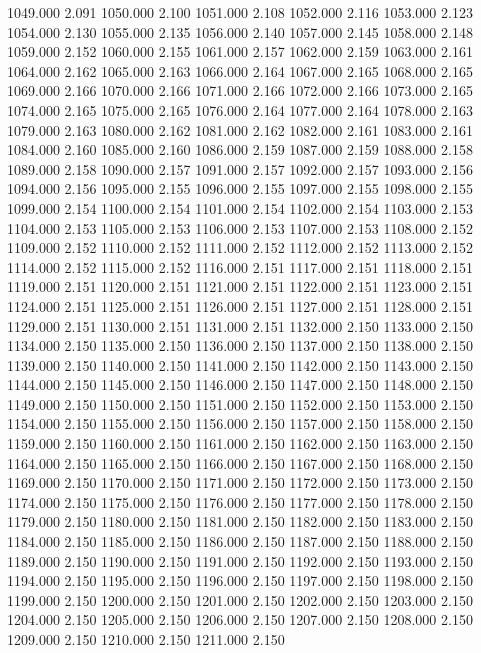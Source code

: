 1049.000 2.091 
1050.000 2.100 
1051.000 2.108 
1052.000 2.116 
1053.000 2.123 
1054.000 2.130 
1055.000 2.135 
1056.000 2.140 
1057.000 2.145 
1058.000 2.148 
1059.000 2.152 
1060.000 2.155 
1061.000 2.157 
1062.000 2.159 
1063.000 2.161 
1064.000 2.162 
1065.000 2.163 
1066.000 2.164 
1067.000 2.165 
1068.000 2.165 
1069.000 2.166 
1070.000 2.166 
1071.000 2.166 
1072.000 2.166 
1073.000 2.165 
1074.000 2.165 
1075.000 2.165 
1076.000 2.164 
1077.000 2.164 
1078.000 2.163 
1079.000 2.163 
1080.000 2.162 
1081.000 2.162 
1082.000 2.161 
1083.000 2.161 
1084.000 2.160 
1085.000 2.160 
1086.000 2.159 
1087.000 2.159 
1088.000 2.158 
1089.000 2.158 
1090.000 2.157 
1091.000 2.157 
1092.000 2.157 
1093.000 2.156 
1094.000 2.156 
1095.000 2.155 
1096.000 2.155 
1097.000 2.155 
1098.000 2.155 
1099.000 2.154 
1100.000 2.154 
1101.000 2.154 
1102.000 2.154 
1103.000 2.153 
1104.000 2.153 
1105.000 2.153 
1106.000 2.153 
1107.000 2.153 
1108.000 2.152 
1109.000 2.152 
1110.000 2.152 
1111.000 2.152 
1112.000 2.152 
1113.000 2.152 
1114.000 2.152 
1115.000 2.152 
1116.000 2.151 
1117.000 2.151 
1118.000 2.151 
1119.000 2.151 
1120.000 2.151 
1121.000 2.151 
1122.000 2.151 
1123.000 2.151 
1124.000 2.151 
1125.000 2.151 
1126.000 2.151 
1127.000 2.151 
1128.000 2.151 
1129.000 2.151 
1130.000 2.151 
1131.000 2.151 
1132.000 2.150 
1133.000 2.150 
1134.000 2.150 
1135.000 2.150 
1136.000 2.150 
1137.000 2.150 
1138.000 2.150 
1139.000 2.150 
1140.000 2.150 
1141.000 2.150 
1142.000 2.150 
1143.000 2.150 
1144.000 2.150 
1145.000 2.150 
1146.000 2.150 
1147.000 2.150 
1148.000 2.150 
1149.000 2.150 
1150.000 2.150 
1151.000 2.150 
1152.000 2.150 
1153.000 2.150 
1154.000 2.150 
1155.000 2.150 
1156.000 2.150 
1157.000 2.150 
1158.000 2.150 
1159.000 2.150 
1160.000 2.150 
1161.000 2.150 
1162.000 2.150 
1163.000 2.150 
1164.000 2.150 
1165.000 2.150 
1166.000 2.150 
1167.000 2.150 
1168.000 2.150 
1169.000 2.150 
1170.000 2.150 
1171.000 2.150 
1172.000 2.150 
1173.000 2.150 
1174.000 2.150 
1175.000 2.150 
1176.000 2.150 
1177.000 2.150 
1178.000 2.150 
1179.000 2.150 
1180.000 2.150 
1181.000 2.150 
1182.000 2.150 
1183.000 2.150 
1184.000 2.150 
1185.000 2.150 
1186.000 2.150 
1187.000 2.150 
1188.000 2.150 
1189.000 2.150 
1190.000 2.150 
1191.000 2.150 
1192.000 2.150 
1193.000 2.150 
1194.000 2.150 
1195.000 2.150 
1196.000 2.150 
1197.000 2.150 
1198.000 2.150 
1199.000 2.150 
1200.000 2.150 
1201.000 2.150 
1202.000 2.150 
1203.000 2.150 
1204.000 2.150 
1205.000 2.150 
1206.000 2.150 
1207.000 2.150 
1208.000 2.150 
1209.000 2.150 
1210.000 2.150 
1211.000 2.150 
